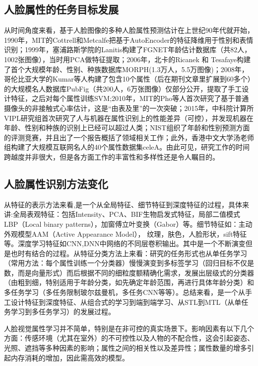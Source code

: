 \subsection{人脸属性的任务目标发展}
从时间角度来看，基于人脸图像的多种人脸属性预测估计在上世纪90年代就开始，1990年，MIT的Cottrell和Metcalfe把基于AutoEncoder的特征降维用于性别和表情识别\cite{EMPATH}；1999年，塞浦路斯学院的Lanitis构建了FGNET年龄估计数据库（共82人，1002张图像），当时用PCA做特征提取\cite{FGNET}；2006年，北卡的Ricanek 和 Tesafaye构建了首个大规模年龄、性别、种族数据库MORPH(1.3万人，5.5万图像)\cite{MORPH}；2008年，哥伦比亚大学的Kumar等人构建了包含10个属性（后在期刊文章里扩展到60多个）的大规模名人数据库PubFig（共200人，6万张图像）仅部分公开，提取了手工设计特征，之后对每个属性训练SVM\cite{FACETRACER};2010年，MIT的Pho等人首次研究了基于普通摄像头的非接触式心率估计，这是“由表及里”的一次突破；2015年，中科院计算所VIPL研究组首次研究了人与机器在属性识别上的性能差异（可控），并发现机器在年龄、性别和种族的识别上已经可以超过人类\cite{HUHAN}；NIST组织了年龄和性别预测方面的评测竞赛，并且出了一个报告概括了领域相关工作\cite{FERET}；此外，香港中文大学汤老师组构建了大规模互联网名人的40个属性数据集celeA\cite{CELEA}。由此可见，研究工作的时间跨越度并非很大，但是各方面工作的丰富性和多样性还是令人瞩目的。
\subsection{人脸属性识别方法变化}
从特征的表示方法来看,是一个从全局特征、细节特征到深度特征的过程，具体来讲:全局表观特征：包括Intensity、PCA\cite{PCA}、BIF生物启发式特征\cite{BIF}，局部二值模式LBP（Local binary patterns）\cite{LBP}，加窗傅立叶变换（Gabor）等。细节特征如：主动外观模型AAM（Active  Appearance  Model）\cite{AAM}，
纹理，肤色，人脸形状，sift特征等。深度学习特征\cite{ADIENCE}\cite{CNNSVM}如CNN,DNN中网络的不同层卷积输出。其中是一个不断演变但是也时有结合的过程。从特征分类方法上来看：研究的任务形式也从单任务学习（常用方法：每个属性训练一个分类器）慢慢演变到多标签学习\cite{CELEA}\cite{HUHAN}（回归目标不仅是数，而是向量形式）而后根据不同的细粒度额精确化需求，发展出层级式的分类器（由粗到细，特别适用于年龄分类，如先确定年龄范围，再进行具体年龄分类）和多任务学习\cite{MULTITASK}（多任务限制玻尔兹曼机，多任务CNN等等）。总结来看，是一个从手工设计特征到深度特征、从组合式的学习到端到端学习、从STL到MTL（从单任务学习到多任务学习）的发展过程。

人脸视觉属性学习并不简单，特别是在非可控的真实场景下。影响因素有以下几个方面：传感环境（尤其在室外）的不可控性以及人物的不配合性，这会引起姿态、光照、遮挡等多种因素的影响；属性之间的相关性以及差异性；属性数量的增多引起内存消耗的增加，因此需高效的模型。
